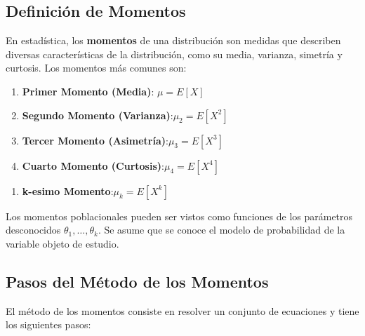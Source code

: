 \documentclass[
  letterpaper,
  DIV=11,
  numbers=noendperiod]{scrreprt}
\providecommand{\tightlist}{%
  \setlength{\itemsep}{0pt}\setlength{\parskip}{0pt}}\usepackage{longtable,booktabs,array}
\begin{document}
\hypertarget{definiciuxf3n-de-momentos}{%
\subsection{Definición de Momentos}\label{definiciuxf3n-de-momentos}}

En estadística, los \textbf{momentos} de una distribución son medidas
que describen diversas características de la distribución, como su
media, varianza, simetría y curtosis. Los momentos más comunes son:

\begin{enumerate}
\def\labelenumi{\arabic{enumi}.}
\tightlist
\item
  \textbf{Primer Momento (Media)}: \(\mu = E[X]\)
\item
  \textbf{Segundo Momento (Varianza)}:\(\mu_2 = E[X^2]\)
\item
  \textbf{Tercer Momento (Asimetría)}:\(\mu_3 = E[X^3]\)
\item
  \textbf{Cuarto Momento (Curtosis)}:\(\mu_4 = E[X^4]\)
\end{enumerate}

\begin{enumerate}
\def\labelenumi{\alph{enumi}.}
\setcounter{enumi}{10}
\tightlist
\item
  \textbf{k-esimo Momento}:\(\mu_k = E[X^k]\)
\end{enumerate}

Los momentos poblacionales pueden ser vistos como funciones de los
parámetros desconocidos \(\theta_1,\ldots,\theta_k\). Se asume que se
conoce el modelo de probabilidad de la variable objeto de estudio.

\hypertarget{pasos-del-muxe9todo-de-los-momentos}{%
\subsection{Pasos del Método de los
Momentos}\label{pasos-del-muxe9todo-de-los-momentos}}

El método de los momentos consiste en resolver un conjunto de ecuaciones
y tiene los siguientes pasos:
\end{document}
